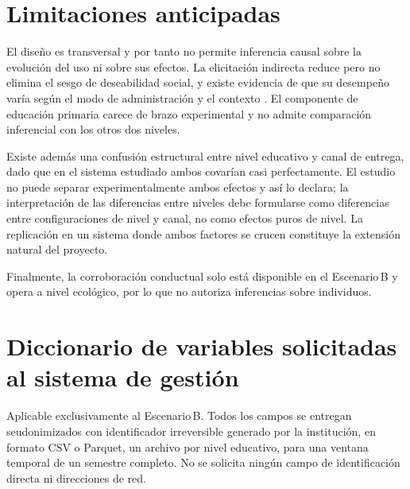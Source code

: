 \documentclass[11pt,a4paper]{article}
\begin{document}
\section{Limitaciones anticipadas}

El diseño es transversal y por tanto no permite inferencia causal sobre la evolución del uso ni sobre sus efectos. La elicitación indirecta reduce pero no elimina el sesgo de deseabilidad social, y existe evidencia de que su desempeño varía según el modo de administración y el contexto \citep{coutts2011sensitive,hinsley2019asking}. El componente de educación primaria carece de brazo experimental y no admite comparación inferencial con los otros dos niveles.

Existe además una confusión estructural entre nivel educativo y canal de entrega, dado que en el sistema estudiado ambos covarían casi perfectamente. El estudio no puede separar experimentalmente ambos efectos y así lo declara; la interpretación de las diferencias entre niveles debe formularse como diferencias entre configuraciones de nivel y canal, no como efectos puros de nivel. La replicación en un sistema donde ambos factores se crucen constituye la extensión natural del proyecto.

Finalmente, la corroboración conductual solo está disponible en el Escenario\,B y opera a nivel ecológico, por lo que no autoriza inferencias sobre individuos.

\newpage
\appendix
\renewcommand{\thesection}{\Alph{section}}

\section{Diccionario de variables solicitadas al sistema de gestión}
\label{anexo:diccionario}

Aplicable exclusivamente al Escenario\,B. Todos los campos se entregan seudonimizados con identificador irreversible generado por la institución, en formato CSV o Parquet, un archivo por nivel educativo, para una ventana temporal de un semestre completo. No se solicita ningún campo de identificación directa ni direcciones de red.
\end{document}
